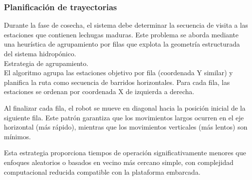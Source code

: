 \subsubsection{Planificación de trayectorias}

Durante la fase de cosecha, el sistema debe determinar la secuencia de visita a las estaciones que contienen lechugas maduras. Este problema se aborda mediante una heurística de agrupamiento por filas que explota la geometría estructurada del sistema hidropónico.\\

Estrategia de agrupamiento.\\
El algoritmo agrupa las estaciones objetivo por fila (coordenada Y similar) y planifica la ruta como secuencia de barridos horizontales. Para cada fila, las estaciones se ordenan por coordenada X de izquierda a derecha.

Al finalizar cada fila, el robot se mueve en diagonal hacia la posición inicial de la siguiente fila. Este patrón garantiza que los movimientos largos ocurren en el eje horizontal (más rápido), mientras que los movimientos verticales (más lentos) son mínimos.

Esta estrategia proporciona tiempos de operación significativamente menores que enfoques aleatorios o basados en vecino más cercano simple, con complejidad computacional reducida compatible con la plataforma embarcada.
